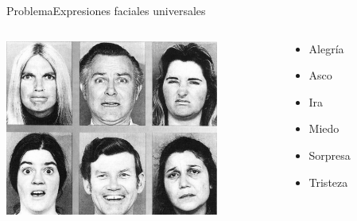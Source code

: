 \documentclass{beamer}
\begin{document}
    \begin{frame}{Problema}{Expresiones faciales universales}
		  \begin{columns}[onlytextwidth]
    		  	\begin{column}{0.7\textwidth}
      			\centering
      			\includegraphics[width=7cm]{imagenes/expresiones_faciales_universales.jpg}
    			\end{column}
    		    \begin{column}{0.3\textwidth}
        	      \begin{itemize}
            	    \item Alegría
            		\item Asco
            		\item Ira
            		\item Miedo
            		\item Sorpresa
            		\item Tristeza
        	   	  \end{itemize}
            \end{column}
          \end{columns}          
          
          
          
    \end{frame}
    
\end{document}

